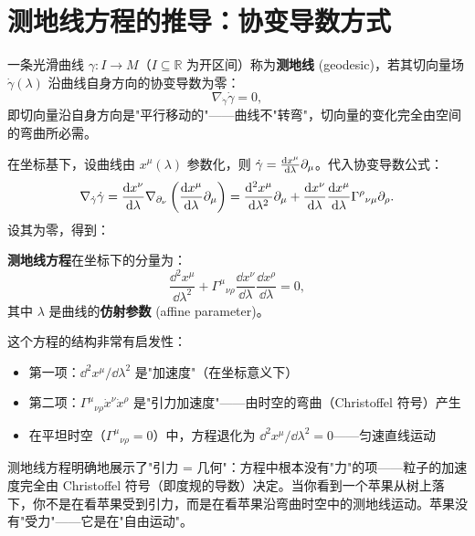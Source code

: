 \section{测地线方程的推导：协变导数方式}
\label{sec:covariant_derivation}

\begin{definition}
一条光滑曲线 $\gamma: I \to M$（$I \subseteq \mathbb{R}$ 为开区间）称为\textbf{测地线} (geodesic)，若其切向量场 $\dot\gamma(\lambda)$ 沿曲线自身方向的协变导数为零：
\begin{equation}
    \boxed{\nabla_{\dot\gamma} \dot\gamma = 0},
\end{equation}
即切向量沿自身方向是"平行移动的"——曲线不"转弯"，切向量的变化完全由空间的弯曲所必需。
\end{definition}

在坐标基下，设曲线由 $x^\mu(\lambda)$ 参数化，则 $\dot\gamma = \frac{\dd x^\mu}{\dd\lambda} \partial_\mu$。代入协变导数公式：
\begin{equation}
    \nabla_{\dot\gamma} \dot\gamma
    = \frac{\dd x^\nu}{\dd\lambda} \nabla_{\partial_\nu} \left( \frac{\dd x^\mu}{\dd\lambda} \partial_\mu \right)
    = \frac{\dd^2 x^\mu}{\dd\lambda^2} \partial_\mu + \frac{\dd x^\nu}{\dd\lambda} \frac{\dd x^\mu}{\dd\lambda} \Gamma^\rho{}_{\nu\mu} \partial_\rho.
\end{equation}
设其为零，得到：

\begin{theorem}
\textbf{测地线方程}在坐标下的分量为：
\begin{equation}
    \boxed{\frac{\dd^2 x^\mu}{\dd\lambda^2} + \Gamma^\mu{}_{\nu\rho} \frac{\dd x^\nu}{\dd\lambda} \frac{\dd x^\rho}{\dd\lambda} = 0},
\end{equation}
其中 $\lambda$ 是曲线的\textbf{仿射参数} (affine parameter)。
\end{theorem}

这个方程的结构非常有启发性：
\begin{itemize}
    \item 第一项：$\dd^2 x^\mu/\dd\lambda^2$ 是"加速度"（在坐标意义下）
    \item 第二项：$\Gamma^\mu{}_{\nu\rho} \dot x^\nu \dot x^\rho$ 是"引力加速度"——由时空的弯曲（Christoffel 符号）产生
    \item 在平坦时空（$\Gamma^\mu{}_{\nu\rho} = 0$）中，方程退化为 $\dd^2 x^\mu/\dd\lambda^2 = 0$——匀速直线运动
\end{itemize}

\begin{note}[物理意义]
测地线方程明确地展示了"引力 = 几何"：方程中根本没有"力"的项——粒子的加速度完全由 Christoffel 符号（即度规的导数）决定。当你看到一个苹果从树上落下，你不是在看苹果受到引力，而是在看苹果沿弯曲时空中的测地线运动。苹果没有"受力"——它是在"自由运动"。
\end{note}

